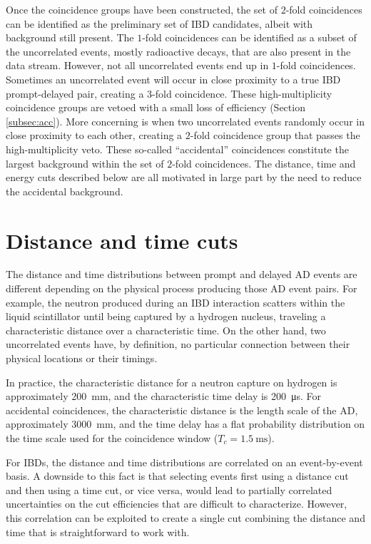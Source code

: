 \documentclass{ucbthesis}
\newcommand{\tc}{\ensuremath{T_c}}
\newcommand{\fold}[1]{\ensuremath{#1}-fold}
\begin{document}
Once the coincidence groups have been constructed,
the set of \fold{2} coincidences can be identified as
the preliminary set of IBD candidates,
albeit with background still present.
The \fold{1} coincidences can be identified as a subset
of the uncorrelated events, mostly radioactive decays,
that are also present in the data stream.
However, not all uncorrelated events end up in \fold{1} coincidences.
Sometimes an uncorrelated event will occur in close proximity to
a true IBD prompt-delayed pair, creating a \fold{3} coincidence.
These high-multiplicity coincidence groups are vetoed
with a small loss of efficiency (Section \ref{subsec:acc}).
More concerning is when two uncorrelated events
randomly occur in close proximity to each other,
creating a \fold{2} coincidence group that passes the high-multiplicity veto.
These so-called ``accidental'' coincidences
constitute the largest background within the set of \fold{2} coincidences.
The distance, time and energy cuts described below
are all motivated in large part by the need to reduce the accidental background.

\section{Distance and time cuts}

The distance and time distributions between prompt and delayed AD events
are different depending on the physical process producing those AD event pairs.
For example, the neutron produced during an IBD interaction
scatters within the liquid scintillator until being captured
by a hydrogen nucleus,
traveling a characteristic distance over a characteristic time.
On the other hand, two uncorrelated events have, by definition,
no particular connection between their physical locations
or their timings.

In practice, the characteristic distance for a neutron capture on hydrogen
is approximately \SI{200}{\milli\meter},
and the characteristic time delay is \SI{200}{\micro\second}.
For accidental coincidences, the characteristic distance is
the length scale of the AD, approximately \SI{3000}{\milli\meter},
and the time delay has a flat probability distribution
on the time scale used for the coincidence window ($\tc = \SI{1.5}{\milli\second}$).

For IBDs, the distance and time distributions are correlated
on an event-by-event basis.
A downside to this fact is that selecting events first using a distance cut
and then using a time cut, or vice versa,
would lead to partially correlated uncertainties on the cut efficiencies
that are difficult to characterize.
However, this correlation can be exploited to create a single cut
combining the distance and time that is straightforward to work with.
\end{document}
